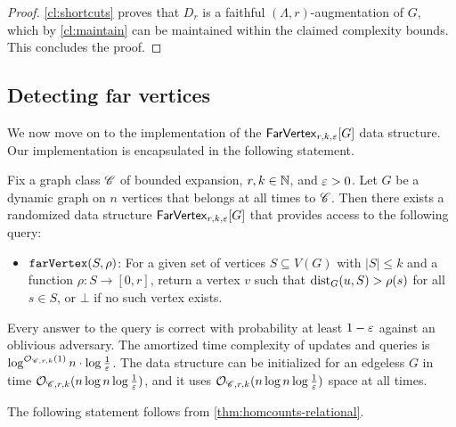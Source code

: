 \begin{proof}
	\cref{cl:shortcuts} proves that $D_r$ is a faithful $(\Lambda,r)$-augmentation of $G$, which by \cref{cl:maintain} can be maintained within the claimed complexity bounds. This concludes the proof.
\end{proof}


\subsection{Detecting far vertices}\label{sec:far-be}

We now move on to the implementation of the $\farVertexDS{G}{r,k,\eps}$ data structure. Our implementation is encapsulated in the following statement.

\begin{theorem}\label{thm:FarVertex-new}
	Fix a graph class $\Cc$ of bounded expansion, $r,k\in \N$, and $\eps>0$.
	Let $G$ be a dynamic graph on $n$ vertices that belongs at all times to $\Cc$. Then there exists a randomized data structure $\farVertexDS{G}{r,k,\eps}$ that provides access to the following query:
	\begin{itemize}
		\item $\far{S,\rho}$: For a given set of vertices $S\subseteq V(G)$ with $|S|\leq k$ and a function $\rho\colon S\to [0,r]$, return a vertex $v$ such that $\dist_G(u,S)>\rho(s)$ for all $s\in S$, or $\bot$ if no such vertex exists.
	\end{itemize}
	Every answer to the query is correct with probability at least $1-\eps$ against an oblivious adversary.
	The amortized time complexity of updates and queries is $\log^{\Oh_{\Cc,r,k}(1)} n\cdot \log \tfrac{1}{\eps}$. The data structure can be initialized for an edgeless $G$ in time $\Oh_{\Cc,r,k}(n\log n\log \tfrac{1}{\eps})$, and it uses $\Oh_{\Cc,r,k}(n\log n\log \tfrac{1}{\eps})$ space at all times.
\end{theorem}

The following statement follows from \cref{thm:homcounts-relational}.%

